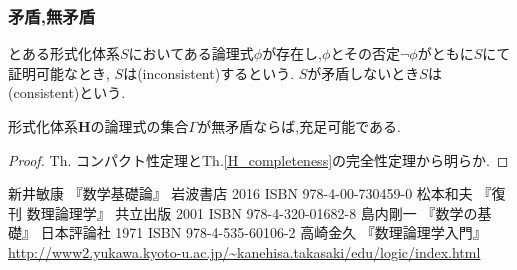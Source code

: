 \subsubsection{矛盾,無矛盾}
\begin{dfn}
とある形式化体系$S$においてある論理式$\phi$が存在し,$\phi$とその否定$\lnot \phi$がともに$S$にて証明可能なとき,
$S$は(inconsistent)するという. $S$が矛盾しないとき$S$は(consistent)という.
\end{dfn}
\begin{thm}
形式化体系$\bm{H}$の論理式の集合$\Gamma$が無矛盾ならば,充足可能である.
\end{thm}
\begin{proof}
 Th.\label{compactness_thm} コンパクト性定理とTh.\ref{H_completeness}の完全性定理から明らか.
\end{proof}

\begin{thebibliography}{9}
		新井敏康 『数学基礎論』 岩波書店 2016 ISBN 978-4-00-730459-0
		松本和夫 『復刊 数理論理学』 共立出版 2001 ISBN 978-4-320-01682-8
		島内剛一 『数学の基礎』 日本評論社 1971 ISBN 978-4-535-60106-2
		高崎金久 『数理論理学入門』 \url{http://www2.yukawa.kyoto-u.ac.jp/~kanehisa.takasaki/edu/logic/index.html}
\end{thebibliography}
